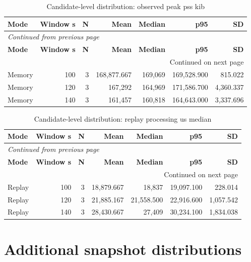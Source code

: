 \documentclass[10pt,a4paper]{article}
\begin{document}
\begingroup\small\setlength{\tabcolsep}{4pt}\renewcommand{\arraystretch}{1.12}
\begin{longtable}{@{}lrrrrrr@{}}
\caption{Candidate-level distribution:\allowbreak{} observed peak pss kib}\\
\toprule
\textbf{Mode} & \textbf{Window s} & \textbf{N} & \textbf{Mean} & \textbf{Median} & \textbf{p95} & \textbf{SD} \\
\midrule\endfirsthead
\multicolumn{7}{l}{\small\itshape Continued from previous page}\\
\toprule
\textbf{Mode} & \textbf{Window s} & \textbf{N} & \textbf{Mean} & \textbf{Median} & \textbf{p95} & \textbf{SD} \\
\midrule\endhead
\midrule\multicolumn{7}{r}{\small Continued on next page}\\\endfoot
\bottomrule\endlastfoot
Memory & 100 & 3 & 168,877.667 & 169,069 & 169,528.900 & 815.022 \\
Memory & 120 & 3 & 167,292 & 164,969 & 171,586.700 & 4,360.337 \\
Memory & 140 & 3 & 161,457 & 160,818 & 164,643.000 & 3,337.696 \\
\end{longtable}\endgroup
\begingroup\small\setlength{\tabcolsep}{4pt}\renewcommand{\arraystretch}{1.12}
\begin{longtable}{@{}lrrrrrr@{}}
\caption{Candidate-level distribution:\allowbreak{} replay processing us median}\\
\toprule
\textbf{Mode} & \textbf{Window s} & \textbf{N} & \textbf{Mean} & \textbf{Median} & \textbf{p95} & \textbf{SD} \\
\midrule\endfirsthead
\multicolumn{7}{l}{\small\itshape Continued from previous page}\\
\toprule
\textbf{Mode} & \textbf{Window s} & \textbf{N} & \textbf{Mean} & \textbf{Median} & \textbf{p95} & \textbf{SD} \\
\midrule\endhead
\midrule\multicolumn{7}{r}{\small Continued on next page}\\\endfoot
\bottomrule\endlastfoot
Replay & 100 & 3 & 18,879.667 & 18,837 & 19,097.100 & 228.014 \\
Replay & 120 & 3 & 21,885.167 & 21,558.500 & 22,916.600 & 1,057.542 \\
Replay & 140 & 3 & 28,430.667 & 27,409 & 30,234.100 & 1,834.038 \\
\end{longtable}\endgroup
\section{Additional snapshot distributions}
\end{document}
